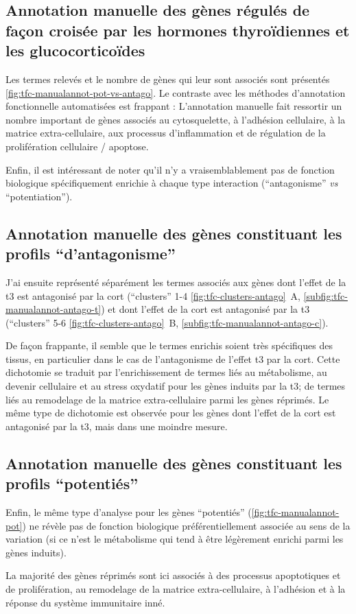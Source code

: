 \documentclass[../main.tex]{subfiles}
\begin{document}
	\subsection{Annotation manuelle des gènes régulés de façon croisée par les hormones thyroïdiennes et les glucocorticoïdes}
		Les termes relevés et le nombre de gènes qui leur sont associés sont présentés \autoref{fig:tfc-manualannot-pot-vs-antago}.
		Le contraste avec les méthodes d'annotation fonctionnelle automatisées est frappant :
		L'annotation manuelle fait ressortir un nombre important de gènes associés au cytosquelette, à l'adhésion cellulaire, à la matrice extra-cellulaire, aux processus d'inflammation et de régulation de la prolifération cellulaire / apoptose.

		

		Enfin, il est intéressant de noter qu'il n'y a vraisemblablement pas de fonction biologique spécifiquement enrichie à chaque type interaction (``antagonisme'' \textit{vs} ``potentiation'').


	\subsection{Annotation manuelle des gènes constituant les profils ``d'antagonisme''}
		J'ai ensuite représenté séparément les termes associés aux gènes dont l'effet de la \gls{t3} est antagonisé par la \gls{cort} (``clusters'' 1-4 \autoref{fig:tfc-clusters-antago}~A, \autoref{subfig:tfc-manualannot-antago-t}) et dont l'effet de la \gls{cort} est antagonisé par la \gls{t3} (``clusters'' 5-6 \autoref{fig:tfc-clusters-antago}~B, \autoref{subfig:tfc-manualannot-antago-c}).

		

		De façon frappante, il semble que le termes enrichis soient très spécifiques des tissus, en particulier dans le cas de l'antagonisme de l'effet \gls{t3}
		par la \gls{cort}.
		Cette dichotomie se traduit par l'enrichissement de termes liés au métabolisme, au devenir cellulaire et au stress oxydatif pour les gènes induits par la \gls{t3}; de termes liés au remodelage de la matrice extra-cellulaire parmi les gènes réprimés.
		Le même type de dichotomie est observée pour les gènes dont l'effet de la \gls{cort} est antagonisé par la \gls{t3}, mais dans une moindre mesure.


	\subsection{Annotation manuelle des gènes constituant les profils ``potentiés''}
		Enfin, le même type d'analyse pour les gènes ``potentiés'' (\autoref{fig:tfc-manualannot-pot}) ne révèle pas de fonction biologique préférentiellement associée au sens de la variation (si ce n'est le métabolisme qui tend à être légèrement enrichi parmi les gènes induits).

		

		La majorité des gènes réprimés sont ici associés à des processus apoptotiques et de prolifération, au remodelage de la matrice extra-cellulaire, à l'adhésion et à la réponse du système immunitaire inné.
\end{document}
